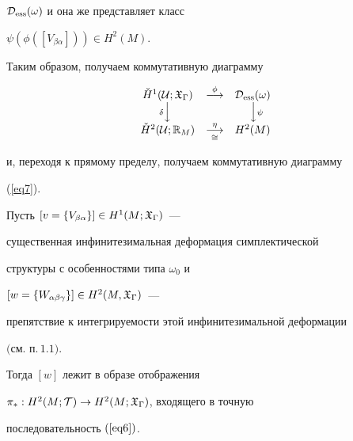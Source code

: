 \begin{pf}
${\cal D}_{\operatorname{ess}}(\omega)$ и она же представляет класс


$\psi(\phi([V_{\beta\alpha}])) \in H^2(M)$.





Таким образом, получаем коммутативную диаграмму


$$


\begin{array}{ccc}


\check{H}^1(\cU;\gX_\Gamma) & \overset{\phi}{\longrightarrow}


& \cD_{\ess}(\omega) \\


{\scriptstyle\delta}{\Big\downarrow}\phantom{\delta} & & \phantom{\psi}


{\Big\downarrow}{\scriptstyle\psi} \\


\check{H}^2(\cU;\R_M) & \underset{\cong}{\overset{\eta}{\longrightarrow}}


& H^2(M)


\end{array}


$$


и, переходя к прямому пределу, получаем коммутативную диаграмму


(\ref{eq7}).


\end{pf}





\begin{stat}


Пусть $[v=\{V_{\beta\alpha}\}] \in H^1(M;{\frak X}_\Gamma)$~---


существенная инфинитезимальная деформация симплектической


структуры с особенностями типа $\omega_0$ и


$[w=\{W_{\alpha\beta\gamma}\}] \in H^2(M, {\frak X}_\Gamma)$~---


препятствие к интегрируемости этой инфинитезимальной деформации


$($см. п.\,$1.1)$.


Тогда $[w]$ лежит в образе отображения


$\pi_* : H^2(M; {\cal T}) \to H^2(M; {\frak X}_\Gamma)$, входящего в точную


последовательность $(\ref{eq6})$.


\end{stat}





